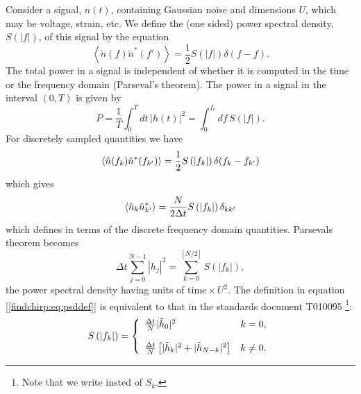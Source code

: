 Consider a signal, $n(t)$, containing Gaussian noise and dimensions $U$, which
may be voltage, strain, etc. We define the (one sided) power spectral density,
$S(|f|)$, of this signal by the equation
\begin{equation}
\left\langle\tilde{n}(f) \tilde{n}^\ast(f')\right\rangle = 
\frac{1}{2}S\left(\left|f\right|\right)\delta(f-f).
\end{equation}
The total power in a signal is independent of whether it is computed in the
time or the frequency domain (Parseval's theorem). The power in a signal in
the interval $(0,T)$  is given by
\begin{equation}
P = \frac{1}{T} \int_{0}^{T} dt\, \left|h(t)\right|^2 = 
\int_{0}^{f_c} df\, S\left(\left|f\right|\right).
\end{equation}
For discretely sampled quantities we have
\begin{equation}
\left\langle\tilde{n}(f_k) \tilde{n}^\ast(f_{k'})\right\rangle = 
\frac{1}{2}S\left(\left|f_{k}\right|\right)\delta(f_k-f_{k'})
\end{equation}
which gives
\begin{equation}
\label{findchirp:eq:ospsddef}
\left\langle\tilde{n}_k \tilde{n}_{k'}^\ast\right\rangle = 
\frac{N}{2\Delta t}S\left(\left|f_{k}\right|\right)\delta_{kk'}
\end{equation}
which defines \ospsd in terms of the discrete frequency domain quantities.
Parsevals theorem becomes
\begin{equation}
\Delta t \sum_{j=0}^{N-1} |h_j|^2 
= \sum_{k=0}^{[N/2]} S\left(\left|f_k\right|\right),
\end{equation}
the power spectral density having units of $\mathrm{time}\times U^2$. The
definition in equation [\ref{findchirp:eq:psddef}] is equivalent to that in
the standards document T010095%
\footnote{Note that we write \ospsd insted of $S_k$.}:
\begin{equation}
S\left(\left|f_{k}\right|\right) = \left\{
\begin{array}{ll}
\frac{\Delta t}{N} | \tilde{h}_0 |^2 & k = 0, \\
\\
\frac{\Delta t}{N} \left[ | \tilde{h}_k |^2 + | \tilde{h}_{N-k} |^2 \right] &
k\neq 0.
\end{array}
\right.
\end{equation}

\newpage
\newpage
\newpage
\newpage
\newpage
\newpage
